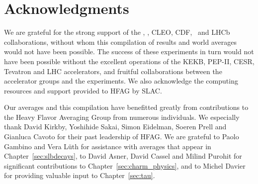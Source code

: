 \section{Acknowledgments}

We are grateful for the strong support of the \belle, 
\babar, CLEO, CDF, \dzero\ and LHCb collaborations, without whom 
this compilation of results and world averages would not have 
been possible. The success of these experiments in turn would 
not have been possible without the excellent operations of the 
KEKB, PEP-II, CESR, Tevatron and LHC accelerators, and fruitful 
collaborations between the accelerator groups and the experiments.
We also acknowledge the computing resources and support provided to HFAG by
SLAC.

Our averages and this compilation have benefitted greatly from 
contributions to the Heavy Flavor Averaging Group from numerous
individuals. We especially thank David Kirkby, Yoshihide Sakai, 
Simon Eidelman, Soeren Prell and Gianluca Cavoto for their
past leadership of HFAG. 
We are grateful to Paolo Gambino and Vera L\"{u}th for assistance with
averages that appear in Chapter~\ref{sec:slbdecays},
to David Asner, David Cassel and Milind Purohit 
for significant contributions to Chapter~\ref{sec:charm_physics}, 
and to Michel Davier for providing valuable input to Chapter~\ref{sec:tau}.
